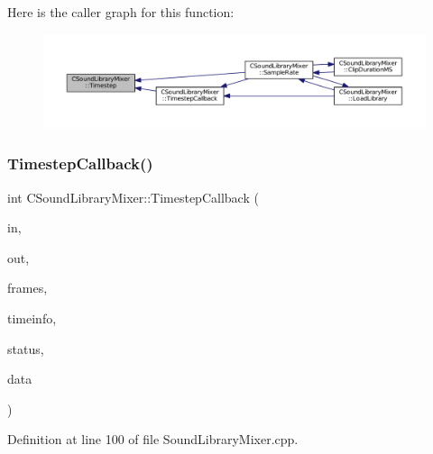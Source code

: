 Here is the caller graph for this function\+:
\nopagebreak
\begin{figure}[H]
\begin{center}
\leavevmode
\includegraphics[width=350pt]{classCSoundLibraryMixer_ad3ef0b67b77862e8c88949c3415095e7_icgraph}
\end{center}
\end{figure}
\hypertarget{classCSoundLibraryMixer_a1d04553aa93769b8bff4bb5c8b7bdfa1}{}\label{classCSoundLibraryMixer_a1d04553aa93769b8bff4bb5c8b7bdfa1} 
\subsubsection{\texorpdfstring{Timestep\+Callback()}{TimestepCallback()}}
{\footnotesize\ttfamily int C\+Sound\+Library\+Mixer\+::\+Timestep\+Callback (\begin{DoxyParamCaption}\item[{const void $\ast$}]{in,  }\item[{void $\ast$}]{out,  }\item[{unsigned long}]{frames,  }\item[{const Pa\+Stream\+Callback\+Time\+Info $\ast$}]{timeinfo,  }\item[{Pa\+Stream\+Callback\+Flags}]{status,  }\item[{void $\ast$}]{data }\end{DoxyParamCaption})\hspace{0.3cm}{\ttfamily [static]}}



Definition at line 100 of file Sound\+Library\+Mixer.\+cpp.


